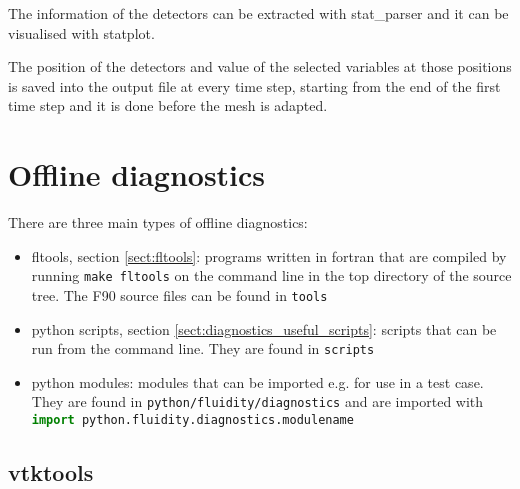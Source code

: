 The information of the detectors can be extracted with stat\_parser and it can be visualised with statplot. 

The position of the detectors and value of the selected variables at those positions is saved into the output file at every time step, starting from the end of the first time step and it is done before the mesh is adapted. 


\section{Offline diagnostics}
\label{sect:offline_diagnostics}

There are three main types of offline diagnostics:
\begin{itemize}
\item fltools, section \ref{sect:fltools}: programs written in fortran that are compiled by running \lstinline[language = XML]+make fltools+ on the command line in the top directory of the \fluidity source tree. The F90 source files can be found in \lstinline[language = XML]+tools+
\item python scripts, section \ref{sect:diagnostics_useful_scripts}: scripts that can be run from the command line. They are found in \lstinline[language = XML]+scripts+
\item python modules: modules that can be imported e.g. for use in a test case. They are found in \lstinline[language = XML]+python/fluidity/diagnostics+ and are imported with  \\ \lstinline[language = python]+import python.fluidity.diagnostics.modulename+
\end{itemize}

\subsection{vtktools}
\label{sect:diagnostics_vtk_tools}

